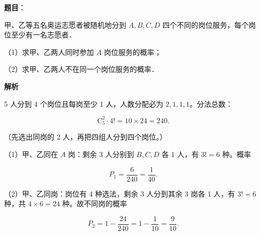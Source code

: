 \begin{answer}

\textbf{题目}：

甲、乙等五名奥运志愿者被随机地分到 $A,B,C,D$ 四个不同的岗位服务，每个岗位至少有一名志愿者．

（1）求甲、乙两人同时参加 $A$ 岗位服务的概率；

（2）求甲、乙两人不在同一个岗位服务的概率．

\textbf{解析}

5 人分到 4 个岗位且每岗至少 1 人，人数分配必为 $2,1,1,1$。分法总数：

\nopagebreak[4]
\[\mathrm C_5^2\cdot4!=10\times24=240 .\]

（先选出同岗的 2 人，再把四组人分到四个岗位。）

（1）甲、乙同在 $A$ 岗：剩余 3 人分别到 $B,C,D$ 各 1 人，有 $3!=6$ 种。概率

\nopagebreak[4]
\[P_1=\frac{6}{240}=\frac1{40}.\]

（2）甲、乙同岗：岗位有 4 种选法，剩余 3 人分到其余 3 岗各 1 人，有 $3!=6$ 种，共 $4\times6=24$ 种。故不同岗的概率

\nopagebreak[4]
\[P_2=1-\frac{24}{240}=1-\frac1{10}=\frac9{10}.\]


\end{answer}
